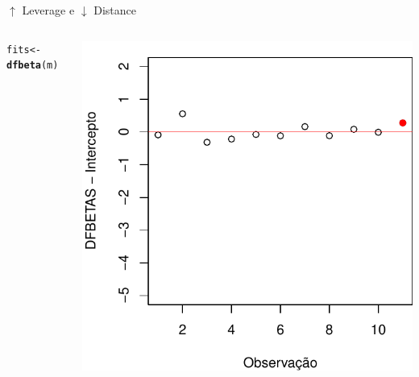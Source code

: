 \documentclass{beamer}\usepackage[]{graphicx}\usepackage[]{color}
\makeatletter
\newcommand{\hlstd}[1]{\textcolor[rgb]{0.345,0.345,0.345}{#1}}%
\newcommand{\hlkwb}[1]{\textcolor[rgb]{0.69,0.353,0.396}{#1}}%
\newcommand{\hlkwd}[1]{\textcolor[rgb]{0.737,0.353,0.396}{\textbf{#1}}}%
\newenvironment{kframe}{%
 \def\at@end@of@kframe{}%
 \ifinner\ifhmode%
  \def\at@end@of@kframe{\end{minipage}}%
  \begin{minipage}{\columnwidth}%
 \fi\fi%
 \def\FrameCommand##1{\hskip\@totalleftmargin \hskip-\fboxsep
 \colorbox{shadecolor}{##1}\hskip-\fboxsep
     \hskip-\linewidth \hskip-\@totalleftmargin \hskip\columnwidth}%
 \MakeFramed {\advance\hsize-\width
   \@totalleftmargin\z@ \linewidth\hsize
   \@setminipage}}%
 {\par\unskip\endMakeFramed%
 \at@end@of@kframe}
\newenvironment{knitrout}{}{} %
\renewenvironment{knitrout}{\setlength{\topsep}{0mm}}{}
\makeatother
\begin{document}
\begin{frame}{$\uparrow$ Leverage e $\downarrow$ Distance}
\begin{columns}[c]
\begin{knitrout}\tiny
{}\color{fgcolor}\begin{kframe}
\begin{alltt}
\hlstd{fits} \hlkwb{<-} \hlkwd{dfbeta}\hlstd{(m)}
\end{alltt}
\end{kframe}
\includegraphics[width=1\linewidth]{figure/inf14-1} 

\end{knitrout}

\end{columns}
\end{frame}
\end{document}
